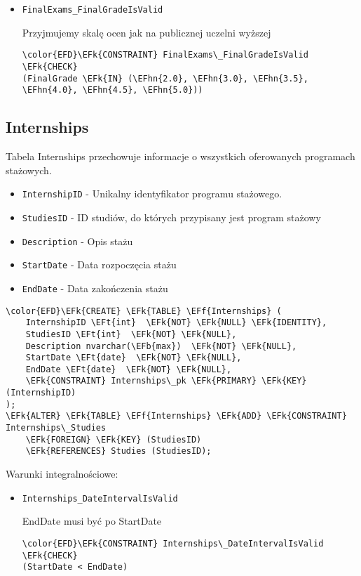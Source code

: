 \documentclass[11pt]{article}
\newcommand{\EFk}[1]{\textcolor{EFk}{\textbf{#1}}} %
\newcommand{\EFb}[1]{\textcolor{EFb}{\textbf{#1}}} %
\newcommand{\EFf}[1]{\textcolor{EFf}{#1}} %
\newcommand{\EFt}[1]{\textcolor{EFt}{\textbf{#1}}} %
\newcommand{\EFhn}[1]{\textcolor{EFhn}{#1}} %
\begin{document}
\begin{itemize}
\item \texttt{FinalExams\_FinalGradeIsValid}

Przyjmujemy skalę ocen jak na publicznej uczelni wyższej
\begin{Code}
\begin{Verbatim}
\color{EFD}\EFk{CONSTRAINT} FinalExams\_FinalGradeIsValid \EFk{CHECK}
(FinalGrade \EFk{IN} (\EFhn{2.0}, \EFhn{3.0}, \EFhn{3.5}, \EFhn{4.0}, \EFhn{4.5}, \EFhn{5.0}))
\end{Verbatim}
\end{Code}
\end{itemize}
\subsection{Internships}
\label{sec:org4ec699f}
Tabela Internships przechowuje informacje o wszystkich oferowanych programach stażowych.
\begin{itemize}
\item \texttt{InternshipID} - Unikalny identyfikator programu stażowego.
\item \texttt{StudiesID} - ID studiów, do których przypisany jest program stażowy
\item \texttt{Description} - Opis stażu
\item \texttt{StartDate} - Data rozpoczęcia stażu
\item \texttt{EndDate} - Data zakończenia stażu
\end{itemize}
\begin{Code}
\begin{Verbatim}
\color{EFD}\EFk{CREATE} \EFk{TABLE} \EFf{Internships} (
    InternshipID \EFt{int}  \EFk{NOT} \EFk{NULL} \EFk{IDENTITY},
    StudiesID \EFt{int}  \EFk{NOT} \EFk{NULL},
    Description nvarchar(\EFb{max})  \EFk{NOT} \EFk{NULL},
    StartDate \EFt{date}  \EFk{NOT} \EFk{NULL},
    EndDate \EFt{date}  \EFk{NOT} \EFk{NULL},
    \EFk{CONSTRAINT} Internships\_pk \EFk{PRIMARY} \EFk{KEY}  (InternshipID)
);
\EFk{ALTER} \EFk{TABLE} \EFf{Internships} \EFk{ADD} \EFk{CONSTRAINT} Internships\_Studies
    \EFk{FOREIGN} \EFk{KEY} (StudiesID)
    \EFk{REFERENCES} Studies (StudiesID);
\end{Verbatim}
\end{Code}
Warunki integralnościowe:


\begin{itemize}
\item \texttt{Internships\_DateIntervalIsValid}

EndDate musi być po StartDate
\begin{Code}
\begin{Verbatim}
\color{EFD}\EFk{CONSTRAINT} Internships\_DateIntervalIsValid \EFk{CHECK}
(StartDate < EndDate)
\end{Verbatim}
\end{Code}
\end{itemize}
\end{document}
